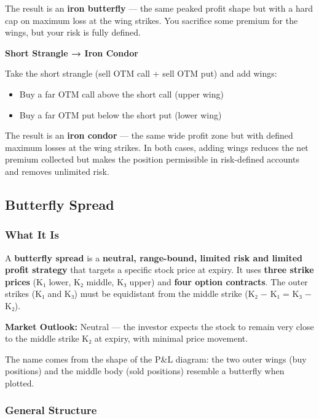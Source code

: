 \documentclass[12pt,openany]{book}
\begin{document}
The result is an \textbf{iron butterfly} — the same peaked profit shape but with a hard cap on maximum loss at the wing strikes. You sacrifice some premium for the wings, but your risk is fully defined.

\textbf{Short Strangle → Iron Condor}

Take the short strangle (sell OTM call + sell OTM put) and add wings:
\begin{itemize}[leftmargin=*]
    \item Buy a far OTM call above the short call (upper wing)
    \item Buy a far OTM put below the short put (lower wing)
\end{itemize}

The result is an \textbf{iron condor} — the same wide profit zone but with defined maximum losses at the wing strikes. In both cases, adding wings reduces the net premium collected but makes the position permissible in risk-defined accounts and removes unlimited risk.



\subsection{Butterfly Spread}

\subsubsection{What It Is}

A \textbf{butterfly spread} is a \textbf{neutral, range-bound, limited risk and limited profit strategy} that targets a specific stock price at expiry. It uses \textbf{three strike prices} (K₁ lower, K₂ middle, K₃ upper) and \textbf{four option contracts}. The outer strikes (K₁ and K₃) must be equidistant from the middle strike (K₂ − K₁ = K₃ − K₂).

\textbf{Market Outlook:} Neutral — the investor expects the stock to remain very close to the middle strike K₂ at expiry, with minimal price movement.

The name comes from the shape of the P\&L diagram: the two outer wings (buy positions) and the middle body (sold positions) resemble a butterfly when plotted.



\subsubsection{General Structure}
\end{document}
